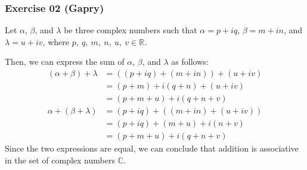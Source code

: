 \subsubsection*{Exercise 02 (Gapry)}

\begin{flushleft}
Let $\alpha$, $\beta$, and $\lambda$ be three complex numbers such that $\alpha = p + iq$, $\beta  = m + in$, and $\lambda = u + iv$, where $p,\ q,\ m,\ n,\ u,\ v \in \mathbb{R}$.

Then, we can express the sum of $\alpha$, $\beta$, and $\lambda$ as follows:
\begin{align*}
(\alpha + \beta) + \lambda &= ((p + iq) + (m + in)) + (u + iv) \\
                           &= (p + m) + i(q + n) + (u + iv)    \\
                           &= (p + m + u) + i(q + n + v)       \\
\alpha + (\beta + \lambda) &= (p + iq) + ((m + in) + (u + iv)) \\
                           &= (p + iq) + (m + u) + i(n + v)    \\
                           &= (p + m + u) + i(q + n + v)
\end{align*}
Since the two expressions are equal, we can conclude that addition is associative in the set of complex numbers $\mathbb{C}$.
\end{flushleft}